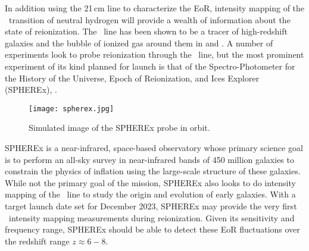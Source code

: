 In addition using the 21\,cm line to characterize the EoR, intensity mapping of the
\lya\ transition of neutral hydrogen will provide a wealth of information about
the state of reionization. The \lya\ line has been shown to be a tracer of high-redshift
galaxies and the bubble of ionized gas around them in \cite{2013ApJ...763..132S} and \cite{2014ApJ...786..111P}.
A number of experiments look to probe reionization through the \lya\ line, but the most
prominent experiment of its kind planned for launch is that of the Spectro-Photometer
for the History of the Universe, Epoch of Reionization, and Ices Explorer (SPHEREx),
\cite{2014arXiv1412.4872D}.

\begin{figure}[th]
	\centering
	\texttt{[image: spherex.jpg]}
	\caption[SPHEREx Instrument]{Simulated image of the SPHEREx probe in orbit.}
	\label{fig:spherex}
\end{figure}

SPHEREx is a near-infrared, space-based observatory whose primary science goal is to perform
an all-sky survey in near-infrared bands of 450 million galaxies to constrain the
physics of inflation using the large-scale structure of these galaxies. While not
the primary goal of the mission, SPHEREx also looks to do intensity mapping of the
\lya\ line to study the origin and evolution of early galaxies. With a target launch
date set for December 2023, SPHEREx may provide the very first \lya\ intensity mapping
measurements during reionization. Given its sensitivity and frequency range, SPHEREx should
be able to detect these EoR fluctuations over the redshift range $z \approx 6 - 8$.
